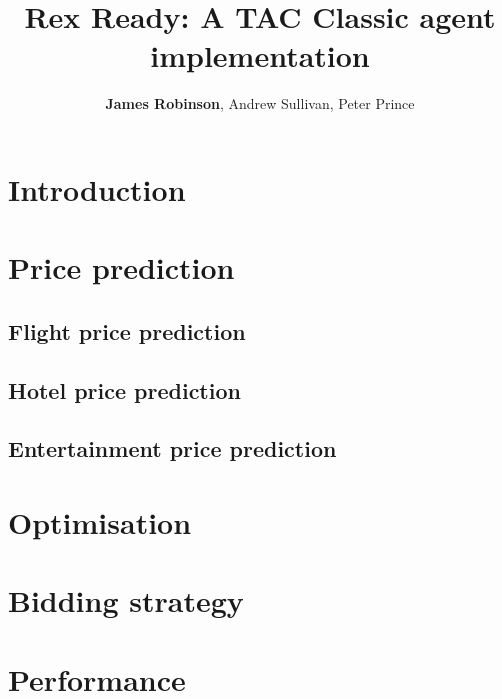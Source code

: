 \documentclass[a4paper]{proc}
\title{Rex Ready: A TAC Classic agent implementation}
\author{\textbf{James Robinson}, Andrew Sullivan, Peter Prince}
\begin{document}
\maketitle

\section{Introduction}

\section{Price prediction}

\subsection{Flight price prediction}

\subsection{Hotel price prediction}

\subsection{Entertainment price prediction}

\section{Optimisation}

\section{Bidding strategy}

\section{Performance}
\end{document}

